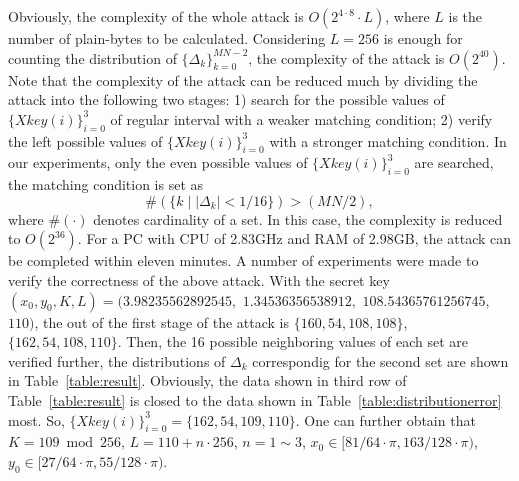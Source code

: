 \documentclass[twocolumn]{svjour3}
\begin{document}
Obviously, the complexity of the whole attack is $O(2^{4\cdot 8}\cdot L)$, where $L$ is the number of plain-bytes to be calculated.
Considering $L=256$ is enough for counting the distribution of $\{\Delta_k\}_{k=0}^{MN-2}$, the complexity of the attack is $O(2^{40})$. Note that the complexity of
the attack can be reduced much by dividing the attack into the following two stages: 1) search for the possible values of $\{\textit{Xkey}(i)\}_{i=0}^3$ of regular interval with a weaker matching condition;
2) verify the left possible values of $\{\textit{Xkey}(i)\}_{i=0}^3$ with a stronger matching condition. In our experiments, only the even possible values of $\{\textit{Xkey}(i)\}_{i=0}^3$
are searched, the matching condition is set as
\begin{equation*}
\#\left( \{k \mid |\Delta_k|<1/16\} \right)>(MN/2),
\end{equation*}
where $\#(\cdot)$ denotes cardinality of a set.
In this case, the complexity is reduced to $O(2^{36})$. For a PC with CPU of 2.83GHz and RAM of 2.98GB, the attack can be
completed within eleven minutes. A number of experiments were made to verify the correctness of the
above attack. With the secret key $(x_0, y_0, K,
L)=(3.98235562892545,$ $ 1.34536356538912,$ $ 108.54365761256745,$ $
110)$, the out of the first stage of the attack is $\{160,54,108,108\}$, $\{162,54,108,110\}$. Then, the 16 possible neighboring values of each
set are verified further, the distributions of $\Delta_k$ correspondig for the second set are shown in Table~\ref{table:result}. Obviously, the
data shown in third row of Table~\ref{table:result} is closed to the data shown in Table~\ref{table:distributionerror} most. So,  $\{\textit{Xkey}(i)\}_{i=0}^3=\{162, 54, 109, 110\}$.
One can further obtain that $K=109\bmod 256$, $L=110+n\cdot 256$, $n=1\sim 3$, $x_0\in [81/64\cdot \pi, 163/128\cdot \pi)$, $y_0\in [27/64\cdot\pi, 55/128\cdot\pi)$.
\end{document}
